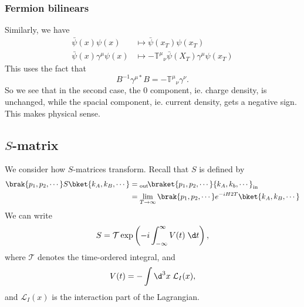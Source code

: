 \documentclass[a4paper]{article}
\begin{document}
\subsubsection*{Fermion bilinears}
Similarly, we have
\begin{align*}
  \bar\psi (x) \psi(x) &\mapsto \bar\psi(x_T) \psi(x_T)\\
  \bar\psi(x) \gamma^\mu \psi(x) &\mapsto -\mathbb{T}^\mu\!_\nu \bar\psi(X_T) \gamma^\mu \psi(x_T)
\end{align*}
This uses the fact that
\[
  B^{-1} \gamma^{\mu*}B = - \mathbb{T}^\mu\!_\nu \gamma^\nu.
\]
So we see that in the second case, the $0$ component, ie. charge density, is unchanged, while the spacial component, ie. current density, gets a negative sign. This makes physical sense.

\subsection{\texorpdfstring{$S$}{S}-matrix}
We consider how $S$-matrices transform. Recall that $S$ is defined by
\begin{align*}
  \brak{p_1, p_2, \cdots} S \bket{k_A, k_B, \cdots} &={} _{\mathrm{out}}\!\braket{p_1, p_2, \cdots}{k_A, k_b, \cdots}_{\mathrm{in}} \\
  &= \lim_{T \to \infty} \brak{p_1, p_2, \cdots} e^{-iH2T} \bket{k_A, k_B, \cdots}
\end{align*}
We can write
\[
  S = \mathcal{T} \exp\left(-i \int_{-\infty}^\infty V(t) \;\d t\right),
\]
where $\mathcal{T}$ denotes the time-ordered integral, and
\[
  V(t) = -\int \d^3 x\; \mathcal{L}_I(x),
\]
and $\mathcal{L}_I(x)$ is the interaction part of the Lagrangian.
\end{document}
